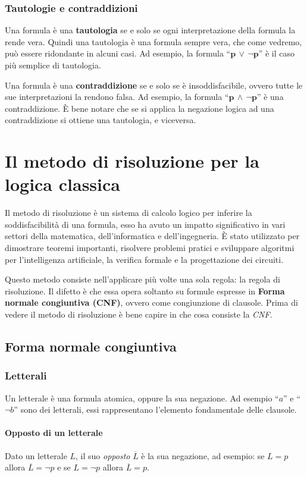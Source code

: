 \documentclass[a4paper,12pt]{report}
\begin{document}
\subsection{Tautologie e contraddizioni}
\label{taut-contr}
Una formula è una \textbf{tautologia} se e solo se ogni interpretazione della formula la rende vera. Quindi una tautologia è una formula sempre vera, che come vedremo, può essere ridondante in alcuni casi. Ad esempio, la formula ``$\mathbf{p \, \lor \, \lnot p}$'' è il caso più semplice di tautologia.

Una formula è una \textbf{contraddizione} se e solo se è insoddisfacibile, ovvero tutte le sue interpretazioni la rendono falsa. Ad esempio, la formula ``$\mathbf{p \, \land \, \lnot p}$'' è una contraddizione. \`E bene notare che se si applica la negazione logica ad una contraddizione si ottiene una tautologia, e viceversa.

% 
% 
\chapter{Il metodo di risoluzione per la logica classica}
\label{resol}
Il metodo di risoluzione è un sistema di calcolo logico per inferire la soddisfacibilità di una formula, esso ha avuto un impatto significativo in vari settori della matematica, dell'informatica e dell'ingegneria. È stato utilizzato per dimostrare teoremi importanti, risolvere problemi pratici e sviluppare algoritmi per l'intelligenza artificiale, la verifica formale e la progettazione dei circuiti. 

Questo metodo consiste nell'applicare più volte una sola regola: la regola di risoluzione. Il difetto è che essa opera soltanto su formule espresse in \textbf{Forma normale congiuntiva (CNF)}, ovvero come congiunzione di clausole. Prima di vedere il metodo di risoluzione è bene capire in che cosa consiste la \textit{CNF}.

\section{Forma normale congiuntiva}
\subsection{Letterali}
Un letterale è una formula atomica, oppure la sua negazione. Ad esempio ``$a$'' e ``$\lnot b$'' sono dei letterali, essi rappresentano l'elemento fondamentale delle clausole.

\subsubsection{Opposto di un letterale}
Dato un letterale $L$, il suo \emph{opposto} $\overline{L}$ è la sua negazione, ad esempio: se $L = p$ allora $\overline{L} = \lnot p$ e se $L = \lnot p$ allora $\overline{L} = p$.
\end{document}
